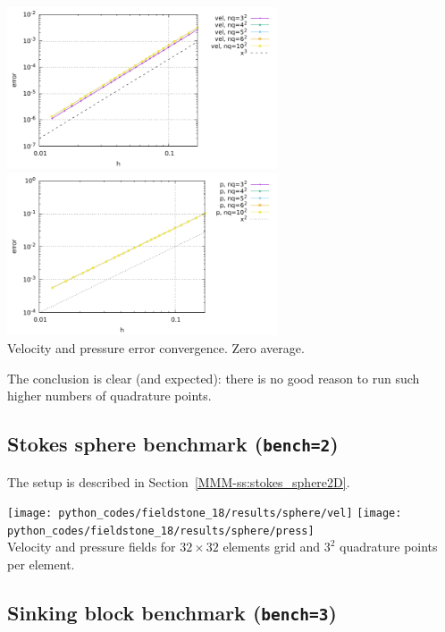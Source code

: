 \begin{center}
\includegraphics[width=8cm]{python_codes/fieldstone_18/results/buha06/errorsV}
\includegraphics[width=8cm]{python_codes/fieldstone_18/results/buha06/errorsP}\\
{\captionfont Velocity and pressure error convergence. Zero average.}
\end{center}

The conclusion is clear (and expected): there is no good reason 
to run such higher numbers of quadrature points.


\newpage
\subsection*{Stokes sphere benchmark ({\tt bench=2})}

The setup is described in Section~\ref{MMM-ss:stokes_sphere2D}.

\begin{center}
\texttt{[image: python\_codes/fieldstone\_18/results/sphere/vel]}
\texttt{[image: python\_codes/fieldstone\_18/results/sphere/press]}\\
{\captionfont Velocity and pressure fields for $32\times 32$ elements grid and $3^2$
quadrature points per element.}
\end{center}

\newpage
\subsection*{Sinking block benchmark ({\tt bench=3})}

